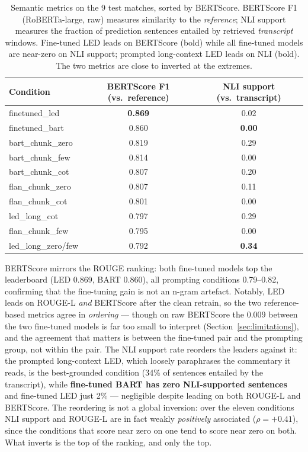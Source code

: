 \documentclass[10pt,a4paper]{article}
\begin{document}
\begin{table}[h]
\centering\small
\begin{tabular}{lcc}
\toprule
\textbf{Condition} & \textbf{BERTScore F1 (vs.\ reference)} & \textbf{NLI support (vs.\ transcript)} \\
\midrule
finetuned\_led      & \textbf{0.869} & 0.02 \\
finetuned\_bart     & 0.860 & \textbf{0.00} \\
bart\_chunk\_zero   & 0.819 & 0.29 \\
bart\_chunk\_few    & 0.814 & 0.00 \\
bart\_chunk\_cot    & 0.807 & 0.20 \\
flan\_chunk\_zero   & 0.807 & 0.11 \\
flan\_chunk\_cot    & 0.801 & 0.00 \\
led\_long\_cot      & 0.797 & 0.29 \\
flan\_chunk\_few    & 0.795 & 0.00 \\
led\_long\_zero/few & 0.792 & \textbf{0.34} \\
\bottomrule
\end{tabular}
\caption{Semantic metrics on the 9 test matches, sorted by BERTScore. BERTScore F1 (RoBERTa-large, raw) measures similarity to the \emph{reference}; NLI support measures the fraction of prediction sentences entailed by retrieved \emph{transcript} windows. Fine-tuned LED leads on BERTScore (bold) while all fine-tuned models are near-zero on NLI support; prompted long-context LED leads on NLI (bold). The two metrics are close to inverted at the extremes.}
\label{tab:semantic}
\end{table}

BERTScore mirrors the ROUGE ranking: both fine-tuned models top the leaderboard (LED 0.869, BART 0.860), all prompting conditions 0.79--0.82, confirming that the fine-tuning gain is not an n-gram artefact. Notably, LED leads on ROUGE-L \emph{and} BERTScore after the clean retrain, so the two reference-based metrics agree in \emph{ordering} --- though on raw BERTScore the 0.009 between the two fine-tuned models is far too small to interpret (Section~\ref{sec:limitations}), and the agreement that matters is between the fine-tuned pair and the prompting group, not within the pair. The NLI support rate reorders the leaders against it: the prompted long-context LED, which loosely paraphrases the commentary it reads, is the best-grounded condition (34\% of sentences entailed by the transcript), while \textbf{fine-tuned BART has zero NLI-supported sentences} and fine-tuned LED just 2\% --- negligible despite leading on both ROUGE-L and BERTScore. The reordering is not a global inversion: over the eleven conditions NLI support and ROUGE-L are in fact weakly \emph{positively} associated ($\rho = +0.41$), since the conditions that score near zero on one tend to score near zero on both. What inverts is the top of the ranking, and only the top.
\end{document}
